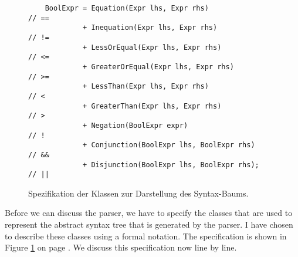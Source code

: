 \begin{figure}[!ht]
\begin{Verbatim}
    BoolExpr = Equation(Expr lhs, Expr rhs)               // ==
             + Inequation(Expr lhs, Expr rhs)             // !=
             + LessOrEqual(Expr lhs, Expr rhs)            // <=
             + GreaterOrEqual(Expr lhs, Expr rhs)         // >=
             + LessThan(Expr lhs, Expr rhs)               // <
             + GreaterThan(Expr lhs, Expr rhs)            // >
             + Negation(BoolExpr expr)                    // !
             + Conjunction(BoolExpr lhs, BoolExpr rhs)    // &&
             + Disjunction(BoolExpr lhs, BoolExpr rhs);   // ||
\end{Verbatim}
\vspace*{-0.3cm}
\caption{Spezifikation der Klassen zur Darstellung des Syntax-Baums.}
\label{fig:program.ep}
\end{figure}
Before we can discuss the parser, we have to specify the classes that are used to represent the
abstract syntax tree that is generated by the parser.  I have chosen to describe these classes using
a formal notation.  The specification is shown in Figure \ref{fig:program.ep} on page \pageref{fig:program.ep}.
We discuss this specification now line by line.
